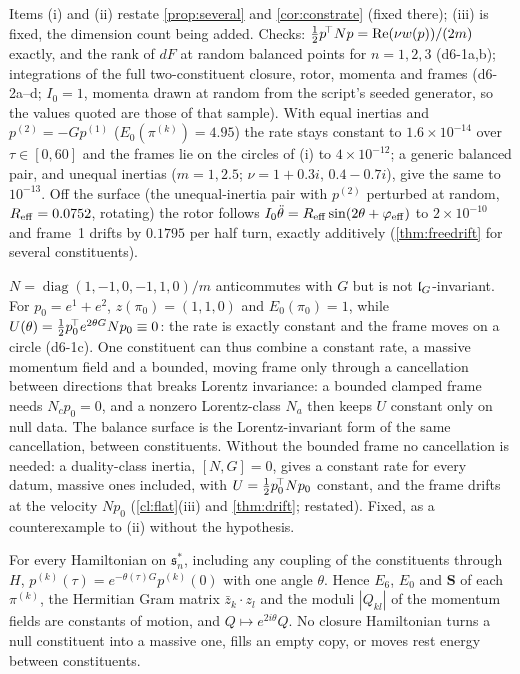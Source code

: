 Items (i) and (ii) restate \cref{prop:several} and \cref{cor:constrate} (fixed there); (iii) is fixed, the dimension count being added.
Checks: $\tfrac12 p^{\!\top}Np=\operatorname{Re}(\nu w(p))/(2m)$ exactly, and the rank of $dF$ at random balanced points for $n=1,2,3$ (d6-1a,b); integrations of
the full two-constituent closure, rotor, momenta and frames (d6-2a--d; $I_0=1$, momenta drawn at random from the script's seeded generator, so
the values quoted are those of that sample). With equal inertias and $p^{(2)}=-Gp^{(1)}$ ($E_0(\pi^{(k)})=4.95$) the
rate stays constant to $1.6\times10^{-14}$ over $\tau\in[0,60]$ and the frames lie on the circles of (i) to $4\times10^{-12}$; a generic balanced
pair, and unequal inertias ($m=1,2.5$; $\nu=1+0.3i,\,0.4-0.7i$), give the same to $10^{-13}$. Off the surface (the unequal-inertia pair with $p^{(2)}$ perturbed at random, $R_{\rm eff}=0.0752$, rotating) the
rotor follows $I_0\ddot\theta=R_{\rm eff}\sin(2\theta+\varphi_{\rm eff})$ to $2\times10^{-10}$ and frame~1 drifts by $0.1795$ per half turn, exactly
additively (\cref{thm:freedrift} for several constituents).

\begin{remark}
\label{d6:rem:lorentzreq}
$N=\operatorname{diag}(1,-1,0,-1,1,0)/m$ anticommutes with $G$ but is not $\mathfrak l_G$-invariant. For $p_0=e^1+e^2$, $z(\pi_0)=(1,1,0)$ and
$E_0(\pi_0)=1$, while $U(\theta)=\tfrac12 p_0^{\!\top}e^{2\theta G}Np_0\equiv0$: the rate is exactly constant and the frame moves on a circle (d6-1c). One
constituent can thus combine a constant rate, a massive momentum field and a bounded, moving frame only through a cancellation between directions
that breaks Lorentz invariance: a bounded clamped frame needs $N_cp_0=0$, and a nonzero Lorentz-class $N_a$ then keeps $U$ constant only on null
data. The balance surface is the Lorentz-invariant form of the same cancellation, between constituents. Without the bounded frame no cancellation
is needed: a duality-class inertia, $[N,G]=0$, gives a constant rate for every datum, massive ones included, with $U=\tfrac12 p_0^{\!\top}Np_0$ constant,
and the frame drifts at the velocity $Np_0$ (\cref{cl:flat}(iii) and \cref{thm:drift}; restated). Fixed, as a counterexample to
(ii) without the hypothesis.
\end{remark}

\begin{corollary}
\label{d6:cor:nopair}
For every Hamiltonian on $\mathfrak s_n^*$, including any coupling of the constituents through $H$, $p^{(k)}(\tau)=e^{-\theta(\tau)G}p^{(k)}(0)$ with
one angle $\theta$. Hence $E_6$, $E_0$ and $\mathbf S$ of each $\pi^{(k)}$, the Hermitian Gram matrix $\bar z_k\cdot z_l$ and the moduli $|Q_{kl}|$
of the momentum fields are constants of motion, and $Q\mapsto e^{2i\theta}Q$. No closure Hamiltonian turns a null constituent into a massive
one, fills an empty copy, or moves rest energy between constituents.
\end{corollary}

